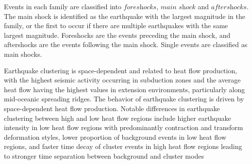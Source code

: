 \documentclass[12pt]{article} %
\theoremstyle{plain}
\begin{document}
	Events in each family are classified into $\textit{foreshocks}$, $\textit{main shock}$ and $\textit{aftershocks}$. The main shock is identified as the earthquake with the largest magnitude in the family, or the first to occur if there are multiple earthquakes with the same largest magnitude. Foreshocks are the events preceding the main shock, and aftershocks are the events following the main shock. Single events are classified as main shocks.
	
	
	
	Earthquake clustering is space-dependent and related to heat flow production, with the highest seismic activity occurring in subduction zones and the average heat flow having the highest values in extension environments, particularly along mid-oceanic spreading ridges. The behavior of earthquake clustering is driven by space-dependent heat flow production. Notable differences in earthquake clustering between high and low heat flow regions include higher earthquake intensity in low heat flow regions with predominantly contraction and transform deformation styles, lower proportion of background events in low heat flow regions, and faster time decay of cluster events in high heat flow regions leading to stronger time separation between background and cluster modes
	
\end{document}
